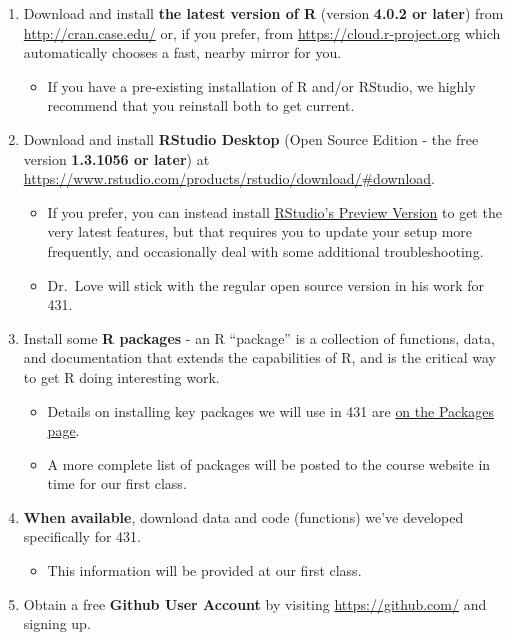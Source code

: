 \documentclass[
]{book}
\providecommand{\tightlist}{%
  \setlength{\itemsep}{0pt}\setlength{\parskip}{0pt}}
\begin{document}
\begin{enumerate}
\def\labelenumi{\arabic{enumi}.}
\tightlist
\item
  Download and install \textbf{the latest version of R} (version \textbf{4.0.2 or later}) from \url{http://cran.case.edu/} or, if you prefer, from \url{https://cloud.r-project.org} which automatically chooses a fast, nearby mirror for you.

  \begin{itemize}
  \tightlist
  \item
    If you have a pre-existing installation of R and/or RStudio, we highly recommend that you reinstall both to get current.
  \end{itemize}
\item
  Download and install \textbf{RStudio Desktop} (Open Source Edition - the free version \textbf{1.3.1056 or later}) at \url{https://www.rstudio.com/products/rstudio/download/\#download}.

  \begin{itemize}
  \tightlist
  \item
    If you prefer, you can instead install \href{https://www.rstudio.com/products/rstudio/download/preview/}{RStudio's Preview Version} to get the very latest features, but that requires you to update your setup more frequently, and occasionally deal with some additional troubleshooting.
  \item
    Dr.~Love will stick with the regular open source version in his work for 431.
  \end{itemize}
\item
  Install some \textbf{R packages} - an R ``package'' is a collection of functions, data, and documentation that extends the capabilities of R, and is the critical way to get R doing interesting work.

  \begin{itemize}
  \tightlist
  \item
    Details on installing key packages we will use in 431 are \href{packages.html}{on the Packages page}.
  \item
    A more complete list of packages will be posted to the course website in time for our first class.
  \end{itemize}
\item
  \textbf{When available}, download data and code (functions) we've developed specifically for 431.

  \begin{itemize}
  \tightlist
  \item
    This information will be provided at our first class.
  \end{itemize}
\item
  Obtain a free \textbf{Github User Account} by visiting \url{https://github.com/} and signing up.


\end{enumerate}
\end{document}
